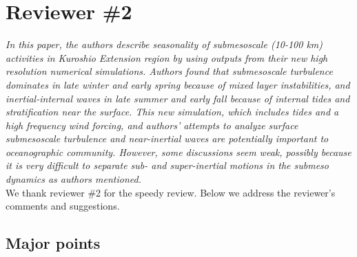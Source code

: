 \documentclass[11pt]{article}
\begin{document}
\section{Reviewer \#2}
{\it In this paper, the authors describe seasonality of submesoscale (10-100 km)
activities in Kuroshio Extension region by using outputs from their new high
resolution numerical simulations. Authors found that submesoscale turbulence
dominates in late winter and early spring because of mixed layer instabilities, and
inertial-internal waves in late summer and early fall because of internal tides and
stratification near the surface. This new simulation, which includes tides and a high
frequency wind forcing, and authors' attempts to analyze surface submesoscale
turbulence and near-inertial waves are potentially important to oceanographic
community. However, some discussions seem weak, possibly because it is very
difficult to separate sub- and super-inertial motions in the submeso dynamics as
authors mentioned.}\\

We thank reviewer \#2 for the speedy review. Below we address the reviewer’s
comments and suggestions.

\subsection{Major points}
\end{document}
